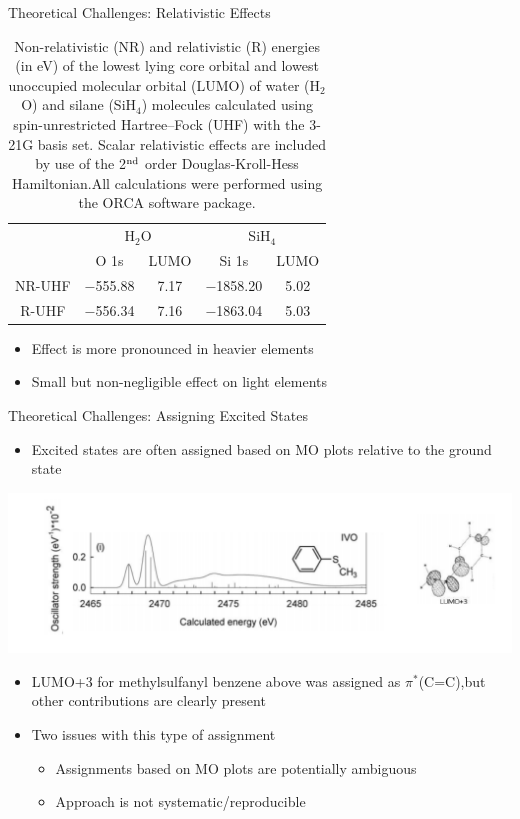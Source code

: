 \documentclass[t]{beamer}
\begin{document}
\begin{frame}{Theoretical Challenges: Relativistic Effects}
\begin{table}
\centering
\caption{Non-relativistic (NR) and relativistic (R) energies (in eV) of the lowest lying core orbital and lowest unoccupied molecular orbital (LUMO) of water (H$_2$O) and silane (SiH$_4$) molecules calculated using spin-unrestricted Hartree--Fock (UHF) with the 3-21G basis set. Scalar relativistic effects are included by use of the 2$^{\rm nd}$ order Douglas-Kroll-Hess Hamiltonian.\footnotemark All calculations were performed using the ORCA software package.}
\begin{tabular}{ccccc}
\toprule
& \multicolumn{2}{c}{H$_2$O} & \multicolumn{2}{c}{SiH$_4$} \\ \cmidrule(lr){2-3} \cmidrule(lr){4-5}
& O 1s & LUMO & Si 1s & LUMO \\
\hline
NR-UHF & $-$555.88 & 7.17 & $-$1858.20 & 5.02\\
R-UHF & $-$556.34 & 7.16 & $-$1863.04 & 5.03\\
\bottomrule
\end{tabular}
\label{tab:rel_effects}
\end{table}
\begin{itemize}
\item Effect is more pronounced in heavier elements
\item Small but non-negligible effect on light elements 
\end{itemize}
\end{frame}

\begin{frame}{Theoretical Challenges: Assigning Excited States}
\begin{itemize}
\item Excited states are often assigned based on MO plots relative to the ground state
\end{itemize}
\centering
\includegraphics[width=\linewidth]{behyan_fig.pdf}
\begin{itemize}
\item LUMO+3 for methylsulfanyl benzene above was assigned as $\pi^*$(C=C),\footnotemark  but other contributions are clearly present
\item Two issues with this type of assignment
		\begin{itemize}
		\item Assignments based on MO plots are potentially ambiguous
		\item Approach is not systematic/reproducible
		\end{itemize}
\end{itemize}
\end{frame}
\end{document}
